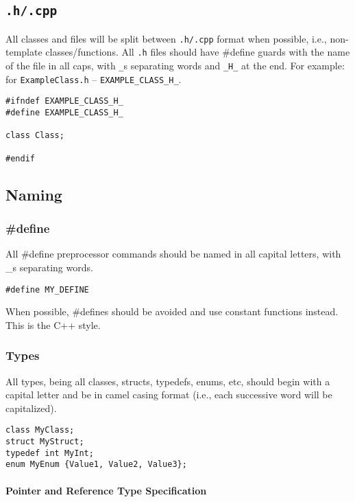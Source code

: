 \documentclass[12pt]{article}
\begin{document}
\subsection{\texttt{.h/.cpp}}
All classes and files will be split between \texttt{.h/.cpp} format when
possible, i.e., non-template classes/functions. All \texttt{.h} files should
have \#define guards with the name of the file in all caps, with \texttt{\_}s
separating words and \texttt{\_H\_} at the end. For example: for
\texttt{ExampleClass.h} -- \texttt{EXAMPLE\_CLASS\_H\_}.

\begin{lstlisting}
#ifndef EXAMPLE_CLASS_H_
#define EXAMPLE_CLASS_H_

class Class;

#endif
\end{lstlisting}

\subsection{Naming}

\subsubsection{\#define}
All \#define preprocessor commands should be named in all capital letters, with
\_s separating words.

\begin{lstlisting}
#define MY_DEFINE
\end{lstlisting}

When possible, \#defines should be avoided and use constant functions instead.
This is the C++ style.

\subsubsection{Types}
All types, being all classes, structs, typedefs, enums, etc, should begin
with a capital letter and be in camel casing format (i.e., each successive word
will be capitalized).

\begin{lstlisting}
class MyClass;
struct MyStruct;
typedef int MyInt;
enum MyEnum {Value1, Value2, Value3};
\end{lstlisting}

\paragraph{Pointer and Reference Type Specification}
\end{document}
